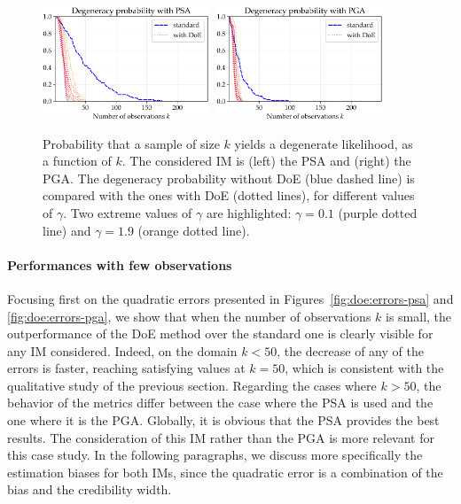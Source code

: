 \begin{figure}[h]
\centering%
\includegraphics[width=5cm]{figures/DoE/degenPSA.pdf}\ 
\includegraphics[width=5cm]{figures/DoE/degenPGA.pdf}%
\caption{Probability that a sample of size $k$ yields a degenerate likelihood, as a function of $k$. The considered IM is (left) the PSA and (right) the PGA.
The degeneracy probability without DoE (blue dashed line) is compared with the ones with DoE (dotted lines), for different values of $\gamma$. 
Two extreme values of $\gamma$ are highlighted: $\gamma=0.1$ (purple dotted line) and $\gamma=1.9$ (orange dotted line).}
\label{fig:doe:errors-degen}
\end{figure}


\paragraph{Performances with few observations} {Focusing first on the quadratic errors presented in Figures~\ref{fig:doe:errors-psa} and \ref{fig:doe:errors-pga}, we show that when the number of observations $k$ is small, the outperformance of the DoE method over the standard one is clearly visible for any IM considered.}
Indeed, on the domain $k<50$, the decrease of any of the errors is faster, reaching satisfying values at $k=50$, which is consistent with the qualitative study of the previous section.
Regarding the cases where $k>50$, the behavior of the metrics differ between the case where the PSA is used and the one where it is the PGA. Globally, it is obvious that the PSA provides the best results. The consideration of this IM rather than the PGA is more relevant for this case study. {In the following paragraphs, we discuss more specifically the estimation biases for both IMs, since the quadratic error is a combination of the bias and the credibility width.}

